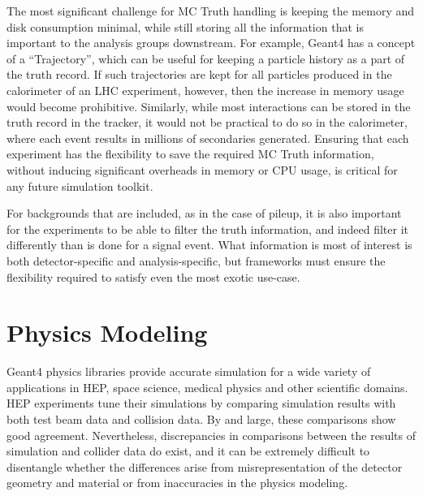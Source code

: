 \documentclass[12pt,a4paper]{article}
\begin{document}
The most significant challenge for MC Truth handling is keeping the
memory and disk consumption minimal, while still storing all the
information that is important to the analysis groups downstream. For
example, Geant4 has a concept of a ``Trajectory'', which can be useful
for keeping a particle history as a part of the truth record. If such
trajectories are kept for all particles produced in the calorimeter of
an LHC experiment, however, then the increase in memory usage would
become prohibitive. Similarly, while most interactions can be stored in
the truth record in the tracker, it would not be practical to do so in
the calorimeter, where each event results in millions of secondaries
generated. Ensuring that each experiment has the flexibility to save the
required MC Truth information, without inducing significant overheads in
memory or CPU usage, is critical for any future simulation toolkit.

For backgrounds that are included, as in the case of pileup, it is also
important for the experiments to be able to filter the truth
information, and indeed filter it differently than is done for a signal
event. What information is most of interest is both detector-specific
and analysis-specific, but frameworks must ensure the flexibility
required to satisfy even the most exotic use-case.

\hypertarget{physics-modeling}{%
\section{Physics Modeling}\label{physics-modeling}}

Geant4 physics libraries provide accurate simulation for a wide variety
of applications in HEP, space science, medical physics and other
scientific domains. HEP experiments tune their simulations by comparing
simulation results with both test beam data and collision data. By and
large, these comparisons show good agreement. Nevertheless,
discrepancies in comparisons between the results of simulation and
collider data do exist, and it can be extremely difficult to disentangle
whether the differences arise from misrepresentation of the detector
geometry and material or from inaccuracies in the physics modeling.
\end{document}
